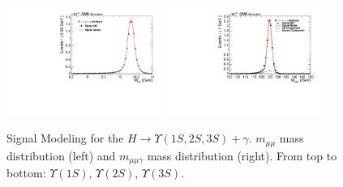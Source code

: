 \begin{figure}[!htbp]
\begin{center}
\includegraphics[width=0.45\textwidth]{figures_and_tables/fitPlotFiles2D/HToUpsilonPhotonSignalAndBackgroundFit/mMuMNU_HToUpsilon3SPhotonSignalAndBackgroundFit_Signal_Cat0}\hspace*{1.cm}
\includegraphics[width=0.45\textwidth]{figures_and_tables/fitPlotFiles2D/HToUpsilonPhotonSignalAndBackgroundFit/mHZ_HToUpsilon3SPhotonSignalAndBackgroundFit_Signal_Cat0_default}\hspace*{1.cm}


\end{center}\vspace*{-.5cm}
\caption{Signal Modeling for the $H \rightarrow \Upsilon(1S,2S,3S) +\gamma$. $m_{\mu\mu}$ mass distribution (left) and $m_{\mu\mu\gamma}$ mass distribution (right). From top to bottom: $\Upsilon(1S)$, $\Upsilon(2S)$, $\Upsilon(3S)$.}
\label{fig:HToUpsilon_Signal_Cat0}
\end{figure}

\clearpage
